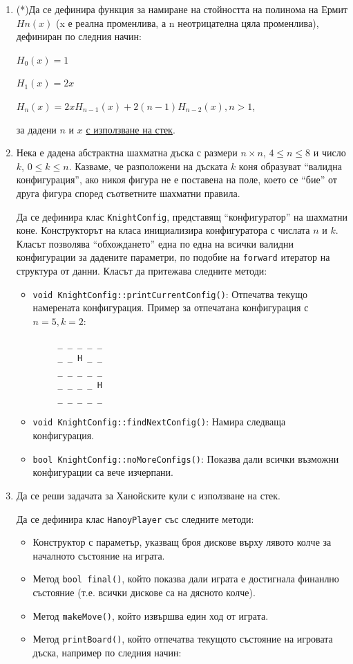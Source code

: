 \begin{enumerate}[resume]

 \item (*)Да се дефинира функция за намиране на стойността на полинома на Ермит $Hn(x)$ (x е реална променлива, а n неотрицателна цяла променлива), дефиниран по следния начин:

 $H_0(x)=1$

 $H_1(x)=2x$

 $H_n(x)=2xH_{n-1}(x)+2(n-1)H_{n-2}(x), n>1$,

 за дадени $n$ и $x$ \underline{с използване на стек}.


 \item Нека е дадена абстрактна шахматна дъска с размери $n \times n$, $4 \le n \le 8$ и число $k$, $0 \le k \le n$. Казваме, че разположени на дъската  $k$ коня образуват ``валидна конфигурация'', ако никоя фигура не е поставена на поле, което се ``бие'' от друга фигура според съответните шахматни правила.

 Да се дефинира клас \texttt{KnightConfig}, представящ ``конфигуратор'' на шахматни коне. Конструкторът на класа инициализира конфигуратора с числата $n$ и $k$. Класът позволява ``обхождането'' една по една на всички валидни конфигурации за дадените параметри, по подобие на \texttt{forward} итератор на структура от данни. Класът да притежава следните методи:

 \begin{itemize}
   \item \texttt{void KnightConfig::printCurrentConfig()}: Отпечатва текущо намерената конфигурация.
     Пример за отпечатана конфигурация с $n=5, k=2$:
     \begin{verbatim}
     _ _ _ _ _
     _ _ H _ _
     _ _ _ _ _
     _ _ _ _ H
     _ _ _ _ _

     \end{verbatim}
   \item \texttt{void KnightConfig::findNextConfig()}: Намира следваща конфигурация.
   \item \texttt{bool KnightConfig::noMoreConfigs()}: Показва дали всички възможни конфигурации са вече изчерпани.
 \end{itemize}

 \item Да се реши задачата за Ханойските кули с използване на стек.

 Да се дефинира клас \texttt{HanoyPlayer} със следните методи:

 \begin{itemize}
   \item Конструктор с параметър, указващ броя дискове върху лявото колче за началното състояние на играта.
   \item Метод \texttt{bool final()}, който показва дали играта е достигнала финанлно състояние (т.е. всички дискове са на дясното колче).
   \item Метод \texttt{makeMove()}, който извършва един ход от играта.
   \item Метод \texttt{printBoard()}, който отпечатва текущото състояние на игровата дъска, например по следния начин:
     \begin{verbatim}


\end{verbatim}
\end{itemize}
\end{enumerate}
